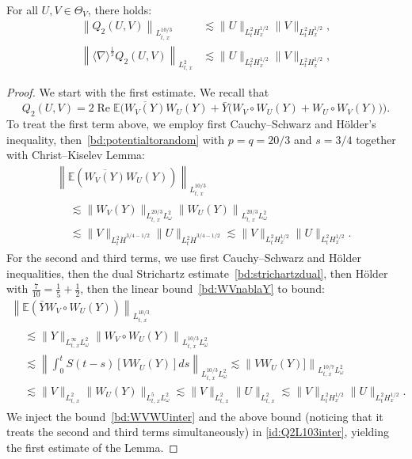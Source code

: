 \documentclass[AHL, Unicode, longabstracts,published]{cedram}
\newcommand{\E}{\mathbb{E}}
\DeclareMathOperator{\Rel}{Re}
\begin{document}
\begin{lemm}\label{prop:QuadV2.1}
For all $U,V\in \Theta_V$, there holds:
\begin{align*}
\left\|Q_2(U,V)\right\|_{L^{10/3}_{t,\,x}} &\lesssim \|U\|_{L^2_tH^{1/2}_{x}} \|V\|_{L^2_tH^{1/2}_{x}}, \\
\left\| \langle \nabla \rangle^{\frac 12} Q_2(U,V)\right\|_{L^{2}_{t,\,x}} &\lesssim \|U\|_{L^2_{t}H^{1/2}_x} \|V\|_{L^2_{t}H^{1/2}_x},
\end{align*}
\end{lemm}

\begin{proof}
We start with the first estimate. We recall that
\begin{equation} \label{id:Q2L103inter}
Q_2(U,V) = 2\Rel \E \Big(\overline{W_V(Y)}W_U(Y) + \bar Y\big(W_V\circ W_U(Y) + W_U\circ W_V(Y)\big)\Big).
\end{equation}
To treat the first term above, we employ first Cauchy--Schwarz and H\"older's inequality, then~\eqref{bd:potentialtorandom} with $p=q=20/3$ and $s=3/4$ together with Christ--Kiselev Lemma:
\begin{multline}\label{bd:WVWUinter}
\left\| \E\left(\overline{W_V(Y)}W_U(Y)\right)\right\|_{L^{10/3}_{t,\,x}}\\
\begin{aligned}
&\lesssim \| W_V(Y)\|_{L^{20/3}_{t,\,x}L^2_\omega} \left\| W_U(Y) \right\|_{L^{20/3}_{t,\,x}L^2_\omega}\\
&\lesssim \| V \|_{L^2_{t}\dot H^{3/4-1/2}} \| U \|_{L^2_{t}\dot H^{3/4-1/2}}\lesssim \| V \|_{L^2_{t}H^{1/2}_x} \| U \|_{L^2_{t}H^{1/2}_x}.
\end{aligned}
\end{multline}
For the second and third terms, we use first Cauchy--Schwarz and H\"older inequalities, then the dual Strichartz estimate~\eqref{bd:strichartzdual}, then H\"older with $\tfrac7{10} = \tfrac1{5} + \tfrac1{2}$, then the linear bound~\eqref{bd:WVnablaY} to bound:
\begin{multline*}
\left\| \E\left(\bar Y W_V\circ W_U(Y)\right)\right\|_{L^{10/3}_{t,\,x}}\\
\begin{aligned}
&\lesssim \| Y\|_{L^{\infty}_{t,\,x}L^2_\omega}\left\| W_V\circ W_U(Y)\right\|_{L^{10/3}_{t,\,x}L^2_\omega}\\
&\lesssim \left\| \int_0^t S(t-s)\left[V W_U(Y)\right] ds\right\|_{L^{10/3}_{t,\,x}L^2_\omega}\lesssim \left\| V W_U(Y)] \right\|_{L^{10/7}_{t,\,x}L^2_\omega}\\
& \lesssim \| V \|_{L^2_{t,\,x}} \|W_U(Y) \|_{L^{5}_{t,\,x}L^2_\omega}\lesssim \| V \|_{L^2_{t,\,x}} \| U \|_{L^{2}_{t,\,x}}\lesssim \| V \|_{L^2_{t}H^{1/2}_x} \| U \|_{L^{2}_{t}H^{1/2}_x}.
\end{aligned}
\end{multline*}
 We inject the bound~\eqref{bd:WVWUinter} and the above bound (noticing that it treats the second and third terms simultaneously) in \eqref{id:Q2L103inter}, yielding the first estimate of the Lemma.


\end{proof}
\end{document}
